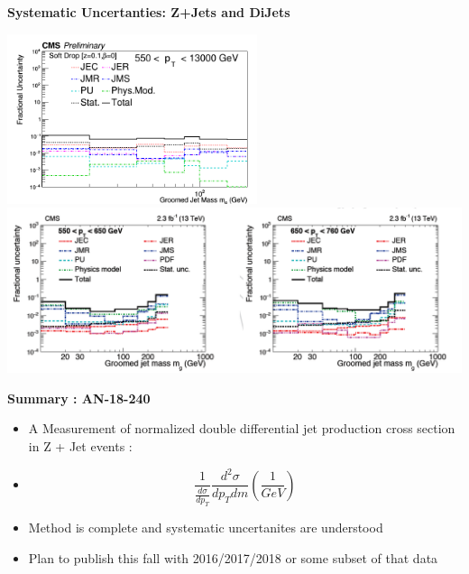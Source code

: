 \documentclass{beamer}
\begin{document}
\begin{frame}{\textbf{Systematic Uncertanties: Z+Jets and DiJets}}


\includegraphics[width=0.55\textwidth]{Oct31_unfoldPlots_sdB0/AllSystematics_FractionofUnfoldedBinContent_ptbin6MC_mass_Ptbin550to13000_Detbinning_Groomingis_sdB0.png}%
\newline
\includegraphics[width=1\textwidth]{dijet550andup.png}
\newline


\end{frame}

\begin{frame}{\textbf{Summary : AN-18-240}}
\vspace{3.5mm}
\begin{itemize}
\item A Measurement of normalized double differential jet production cross section in Z + Jet events :
\item[] $$ \frac{1}{ \frac{d\sigma}{dp_{T}} }   \frac{d^2\sigma}{dp_{T} dm}  (\frac{1}{GeV})  $$

\item Method is complete and systematic uncertanites are understood
\item Plan to publish this fall with 2016/2017/2018 or some subset of that data




\end{itemize}
\end{frame}
\end{document}
